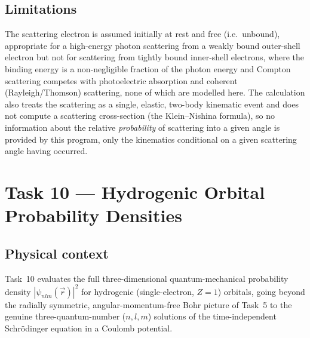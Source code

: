 \documentclass[11pt]{article}
\begin{document}
\subsection{Limitations}
The scattering electron is assumed initially at rest and free (i.e.\ unbound), appropriate for a high-energy photon scattering from a weakly bound outer-shell electron but not for scattering from tightly bound inner-shell electrons, where the binding energy is a non-negligible fraction of the photon energy and Compton scattering competes with photoelectric absorption and coherent (Rayleigh/Thomson) scattering, none of which are modelled here. The calculation also treats the scattering as a single, elastic, two-body kinematic event and does not compute a scattering cross-section (the Klein--Nishina formula), so no information about the relative \emph{probability} of scattering into a given angle is provided by this program, only the kinematics conditional on a given scattering angle having occurred.

\section{Task 10 --- Hydrogenic Orbital Probability Densities}
\label{sec:task10}

\subsection{Physical context}
Task~10 evaluates the full three-dimensional quantum-mechanical probability density $|\psi_{nlm}(\vec r)|^2$ for hydrogenic (single-electron, $Z=1$) orbitals, going beyond the radially symmetric, angular-momentum-free Bohr picture of Task~5 to the genuine three-quantum-number ($n,l,m$) solutions of the time-independent Schr\"odinger equation in a Coulomb potential.
\end{document}
